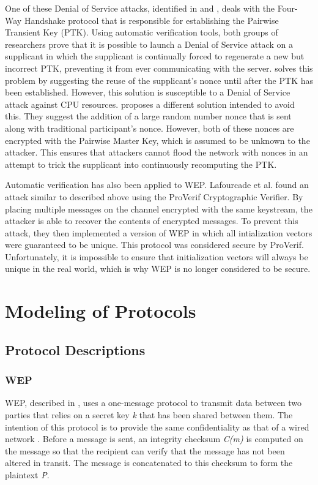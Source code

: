 \documentclass[11pt, twocolumn]{article} %
\begin{document}
One of these Denial of Service attacks, identified in \cite{he04} and \cite{liu08}, deals with the Four-Way Handshake protocol that is responsible for establishing the Pairwise Transient Key (PTK).  Using automatic verification tools, both groups of researchers prove that it is possible to launch a Denial of Service attack on a supplicant in which the supplicant is continually forced to regenerate a new but incorrect PTK, preventing it from ever communicating with the server.  \cite{he04} solves this problem by suggesting the reuse of the supplicant's nonce until after the PTK has been established.  However, this solution is susceptible to a Denial of Service attack against CPU resources.  \cite{liu08} proposes a different solution intended to avoid this.  They suggest the addition of a large random number nonce that is sent along with traditional participant's nonce.  However, both of these nonces are encrypted with the Pairwise Master Key, which is assumed to be unknown to the attacker.  This ensures that attackers cannot flood the network with nonces in an attempt to trick the supplicant into continuously recomputing the PTK.

Automatic verification has also been applied to WEP.  Lafourcade et al. found an attack similar to \cite{borisov09} described above using the ProVerif Cryptographic Verifier. By placing multiple messages on the channel encrypted with the same keystream, the attacker is able to recover the contents of encrypted messages.  To prevent this attack, they then implemented a version of WEP in which all intialization vectors were guaranteed to be unique.  This protocol was considered secure by ProVerif.  Unfortunately, it is impossible to ensure that initialization vectors will always be unique in the real world, which is why WEP is no longer considered to be secure.
 
\section{Modeling of Protocols}
\label{sec:model}
\subsection{Protocol Descriptions}
\subsubsection{WEP}
WEP, described in \cite{borisov01}, uses a one-message protocol to transmit data between two parties that relies on a secret key \textit{k} that has been shared between them.  The intention of this protocol is to provide the same confidentiality as that of a wired network \cite{IEEE802.11}.  Before a message is sent, an integrity checksum \textit{C(m)} is computed on the message so that the recipient can verify that the message has not been altered in transit.  The message is concatenated to this checksum to form the plaintext \textit{P}.
\end{document}
